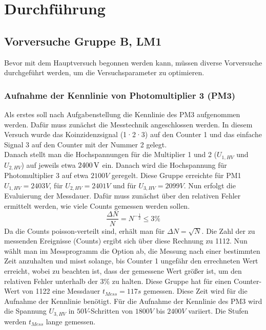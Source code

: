 \section{Durchführung}
    \subsection{Vorversuche Gruppe B, LM1}
        Bevor mit dem Hauptversuch begonnen werden kann, müssen diverse Vorversuche durchgeführt werden, um die Versuchsparameter zu optimieren.
        \subsubsection{Aufnahme der Kennlinie von Photomultiplier 3 (PM3)}
            Als erstes soll nach Aufgabenstellung die Kennlinie des PM3 aufgenommen werden. Dafür muss zunächst die Messtechnik angeschlossen werden. In diesem Versuch wurde das Koinzidenzsignal (1·2·3) auf den Counter 1 und das einfache Signal 3 auf den Counter mit der Nummer 2 gelegt.\\
            Danach stellt man die Hochspannungen für die Multiplier 1 und 2 ($U_{1,HV}$ und $U_{2,HV}$) auf jeweils etwa $\unit[2400]{V}$ ein. Danach wird die Hochspannung für Photomultiplier 3 auf etwa $2100\unit{V}$ geregelt. Diese Gruppe erreichte für PM1 $U_{1,HV} = 2403\unit{V}$, für $U_{2,HV} = 2401\unit{V}$ und für $U_{3,HV} = 2099\unit{V}$. 
            Nun erfolgt die Evaluierung der Messdauer. Dafür muss zunächst über den relativen Fehler ermittelt werden, wie viele Counts gemessen werden sollen. 
            $$ \frac{\Delta N}{N} = N^{-\frac{1}{2}} \leq 3\unit{\%}$$
            Da die Counts poisson-verteilt sind, erhält man für $\Delta N = \sqrt{N}$. Die Zahl der zu messenden Ereignisse (Counts) ergibt sich über diese Rechnung zu 1112. Nun wählt man im Messprogramm die Option ab, die Messung nach einer bestimmten Zeit anzuhalten und misst solange, bis Counter 1 ungefähr den errechneten Wert erreicht, wobei zu beachten ist, dass der gemessene Wert größer ist, um den relativen Fehler unterhalb der $3\unit{\%}$ zu halten. Diese Gruppe hat für einen Counter-Wert von 1122 eine Messdauer $t_{Mess} = 117\unit{s}$ gemessen. Diese Zeit wird für die Aufnahme der Kennlinie benötigt.
            Für die Aufnahme der Kennlinie des PM3 wird die Spannung $U_{3,HV}$ in $50\unit{V}$-Schritten von $1800\unit{V}$ bis $2400\unit{V}$ variiert. Die Stufen werden $t_{Mess}$ lange gemessen. 
